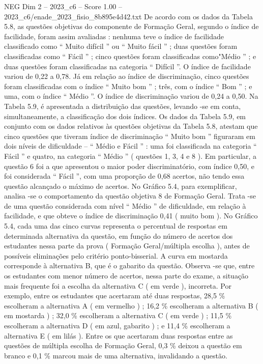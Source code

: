 \begin{textsample}{NEG Dim 2 – 2023\_c6 – Score 1.00 – 2023\_c6/enade\_2023\_fisio\_8b895e4d42.txt}
De acordo com os dados da Tabela 5.8, as questões objetivas do componente de Formação Geral, segundo o índice de facilidade, foram assim avaliadas : nenhuma teve o índice de facilidade classificado como “ Muito difícil ” ou “ Muito fácil ” ; duas questões foram classificadas como “ Fácil ” ; cinco questões foram classificadas como"Médio ” ; e duas questões foram classificadas na categoria “ Difícil ”.
O índice de facilidade variou de 0,22 a 0,78.
Já em relação ao índice de discriminação, cinco questões foram classificadas com o índice “ Muito bom ” ; três, com o índice “ Bom ” ; e uma, com o índice “ Médio ”.
O índice de discriminação variou de 0,24 a 0,50.
Na Tabela 5.9, é apresentada a distribuição das questões, levando -se em conta, simultaneamente, a classificação dos dois índices.
Os dados da Tabela 5.9, em conjunto com os dados relativos às questões objetivas da Tabela 5.8, atestam que cinco questões que tiveram índice de discriminação “ Muito bom ” figuraram em dois níveis de dificuldade – “ Médio e Fácil ” : uma foi classificada na categoria “ Fácil ” e quatro, na categoria “ Médio ” ( questões 1, 3, 4 e 8 ).
Em particular, a questão 6 foi a que apresentou o maior poder discriminatório, com índice 0,50, e foi considerada “ Fácil ”, com uma proporção de 0,68 acertos, não tendo essa questão alcançado o máximo de acertos.
No Gráfico 5.4, para exemplificar, analisa -se o comportamento da questão objetiva 8 de Formação Geral.
Trata -se de uma questão considerada com nível “ Médio ” de dificuldade, em relação à facilidade, e que obteve o índice de discriminação 0,41 ( muito bom ).
No Gráfico 5.4, cada uma das cinco curvas representa o percentual de respostas em determinada alternativa da questão, em função do número de acertos dos estudantes nessa parte da prova ( Formação Geral/múltipla escolha ), antes de possíveis eliminações pelo critério ponto-bisserial.
A curva em mostarda corresponde à alternativa B, que é o gabarito da questão.
Observa -se que, entre os estudantes com menor número de acertos, nessa parte do exame, a situação mais frequente foi a escolha da alternativa C ( em verde ), incorreta.
Por exemplo, entre os estudantes que acertaram até duas respostas, 28,5 \% escolheram a alternativa A ( em vermelho ) ; 16,2 \% escolheram a alternativa B ( em mostarda ) ; 32,0 \% escolheram a alternativa C ( em verde ) ; 11,5 \% escolheram a alternativa D ( em azul, gabarito ) ; e 11,4 \% escolheram a alternativa E ( em lilás ).
Entre os que acertaram duas respostas entre as questões de múltipla escolha de Formação Geral, 0,3 \% deixou a questão em branco e 0,1 \% marcou mais de uma alternativa, invalidando a questão.

\end{textsample}
